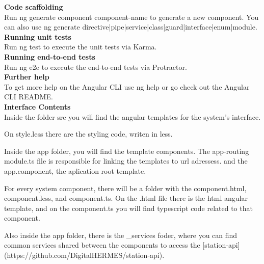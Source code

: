\documentclass[11pt,a4paper]{article}
\begin{document}
\textbf{Code scaffolding}\\
Run ng generate component component-name to generate a new component. You can also use ng generate directive|pipe|service|class|guard|interface|enum|module.\\


\textbf{Running unit tests}\\
Run ng test to execute the unit tests via Karma.\\

\textbf{Running end-to-end tests}\\
Run ng e2e to execute the end-to-end tests via Protractor.\\

\textbf{Further help}\\
To get more help on the Angular CLI use ng help or go check out the Angular CLI README.\\

\textbf{Interface Contents}\\
Inside the folder src you will find the angular templates for the system's interface.

On style.less there are the styling code, writen in less.

Inside the app folder, you will find the template components. The app-routing module.ts file is responsible for linking the templates to url adressess. and the app.component, the aplication root template.

For every system component, there will be a folder with the component.html, component.less, and component.ts. On the .html file there is the html angular template, and on the component.ts you will find typescript code related to that component.

Also inside the app folder, there is the \_services foder, where you can find common services shared between the components to access the [station-api] (https://github.com/DigitalHERMES/station-api).
\end{document}
